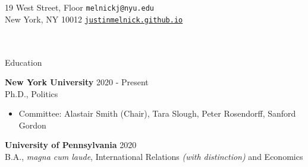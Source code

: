 \documentclass{resume} %
\begin{document}
19 West  Street,  Floor \hfill \texttt{melnickj@nyu.edu}\\
New York, NY 10012 \hfill \texttt{\href{https://justinmelnick.github.io}{justinmelnick.github.io}} \\\\\\
\begin{rSection}{Education}

{\bf New York University} \hfill { 2020 - Present} \\
Ph.D., Politics 
\begin{itemize}
    \item Committee: Alastair Smith (Chair), Tara Slough, Peter Rosendorff, Sanford Gordon
\end{itemize}
\vspace*{0.075in}

{\bf University of Pennsylvania} \hfill { 2020} 
\\B.A., \emph{magna cum laude}, International Relations \emph{(with distinction)} and Economics


\end{rSection}
\end{document}
